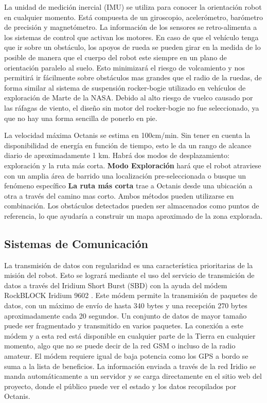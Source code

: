 \documentclass[a4paper,12pt]{article}
\begin{document}
La unidad de medición inercial (IMU) se utiliza para conocer la orientación robot en cualquier momento. Está compuesta de un giroscopio, acelerómetro, barómetro de precisión y magnetómetro. La información de los sensores se retro-alimenta a los sistemas de control que activan los motores. En caso de que el vehículo tenga que ir sobre un obstáculo, los apoyos de rueda se pueden girar en la medida de lo posible de manera que el cuerpo del robot este siempre en un plano de orientación paralelo al suelo. Esto minimizará el riesgo de volcamiento y nos permitirá ir fácilmente sobre obstáculos mas grandes que el radio de la ruedas, de forma similar al sistema de suspensión rocker-bogie utilizado en vehículos de exploración de Marte de la NASA\cite{rockerbogie}. Debido al alto riesgo de vuelco causado por las ráfagas de viento, el diseño sin motor del rocker-bogie no fue seleccionado, ya que no hay una forma sencilla de ponerlo en pie.

La velocidad máxima Octanis se estima en 100cm/min. Sin tener en cuenta la disponibilidad de energía en función de tiempo, esto le da un rango de alcance diario de aproximadamente 1 km. Habrá dos modos de desplazamiento: exploración y la ruta más corta. \textbf{Modo Exploración} hará que el robot atraviese con un amplia área de barrido una localización pre-seleccionada o busque un fenómeno específico \textbf{La ruta más corta} trae a Octanis desde una ubicación a otra a través del camino mas corto. Ambos métodos pueden utilizarse en combinación. Los obstáculos detectados pueden ser almacenados como puntos de referencia, lo que ayudaría a construir un mapa aproximado de la zona explorada.

\subsection{Sistemas de Comunicación}
La transmisión de datos con regularidad es una característica prioritarias de la misión del robot. Esto se logrará mediante el uso del servicio de transmición de datos a través del Iridium Short Burst (SBD) con la ayuda del módem RockBLOCK Iridium 9602 \cite{iridium}. Este módem permite la transmisión de paquetes de datos, con un máximo de envío de hasta 340 bytes y una recepción 270 bytes aproximadamente cada 20 segundos. Un conjunto de datos de mayor tamaño puede ser fragmentado y transmitido en varios paquetes. La conexión a este módem y a esta red está disponible en cualquier parte de la Tierra en cualquier momento, algo que no se puede decir de la red GSM o incluso de la radio amateur. El módem requiere igual de baja potencia como los GPS a bordo se suma a la lista de beneficios. La información enviada a través de la red Iridio se manda automáticamente a un servidor y se carga directamente en el sitio web del proyecto, donde el público puede ver el estado y los datos recopilados por Octanis.
\end{document}
